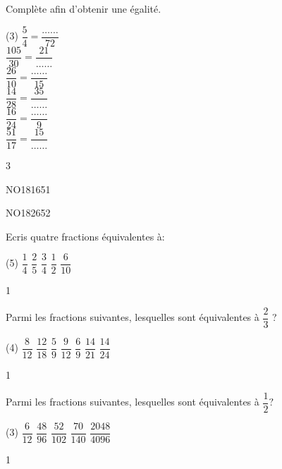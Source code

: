 \documentclass[a4paper,12pt]{report}
\begin{document}
\begin{exop}{
Complète afin d'obtenir une égalité.
\begin{tasks}[after-item-skip = 0.2em, after-skip=-1em](3)
    \task $\dfrac{5}{4}=\dfrac{\ldots\ldots}{72}$\\
    \task $\dfrac{105}{30}=\dfrac{21}{\ldots\ldots}$\\
    \task $\dfrac{26}{10}=\dfrac{\ldots\ldots}{15}$\\
    \task $\dfrac{14}{28}=\dfrac{35}{\ldots\ldots}$\\
    \task $\dfrac{16}{24}=\dfrac{\ldots\ldots}{9}$\\
    \task $\dfrac{51}{17}=\dfrac{15}{\ldots\ldots}$\\
\end{tasks}
}{3}\end{exop}


\begin{exof}{NO181}{65}{1}
\end{exof}
\begin{exof}{NO182}{65}{2}
\end{exof}


\begin{exo}{
Ecris quatre fractions équivalentes à:
\begin{tasks}[after-item-skip = 0.2em, after-skip=-0.5em](5)
\task $\dfrac{1}{4}$
\task $\dfrac{2}{5}$
\task $\dfrac{3}{4}$
\task $\dfrac{1}{2}$
\task $\dfrac{6}{10}$
\end{tasks}
 \vspace{1pt}
}{1}\end{exo}

\begin{exo}{
Parmi les fractions suivantes, lesquelles sont équivalentes à $\dfrac{2}{3}$ ?
\begin{tasks}[after-item-skip = 0.2em](4)
\task $\dfrac{8}{12}$
\task $\dfrac{12}{18}$
\task $\dfrac{5}{9}$
\task $\dfrac{9}{12}$
\task $\dfrac{6}{9}$
\task $\dfrac{14}{21}$
\task $\dfrac{14}{24}$
\end{tasks}
 \vspace{1pt}
}{1}\end{exo}

\begin{exo}{
Parmi les fractions suivantes, lesquelles sont équivalentes à $\dfrac{1}{2} ?$
\begin{tasks}(3)
\task $\dfrac{6}{12}$
\task $\dfrac{48}{96}$
\task $\dfrac{52}{102}$
\task $\dfrac{70}{140}$
\task $\dfrac{2048}{4096}$
\end{tasks}
 \vspace{1pt}
}{1}\end{exo}
\end{document}
